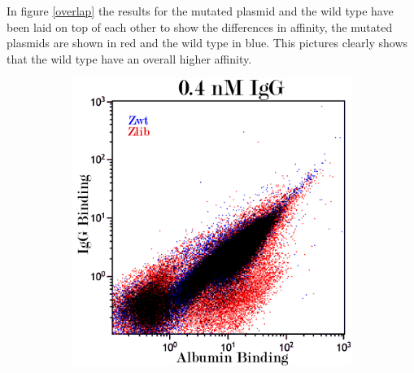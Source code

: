 \documentclass{article}
\begin{document}
\begin{multicols}{2}
	In figure \ref{overlap} the results for the mutated plasmid and the wild type have been laid on top of each other to show the differences in affinity, the mutated plasmids are shown in red and the wild type in blue. This pictures clearly shows that the wild type have an overall higher affinity.
	
	\begin{figure}[H]
		\centering
		\begin{subfigure}{0.6\linewidth}
			\includegraphics[width=\linewidth]{images/overlap_04.png}
		\end{subfigure}
		

\end{figure}
\end{multicols}
\end{document}
